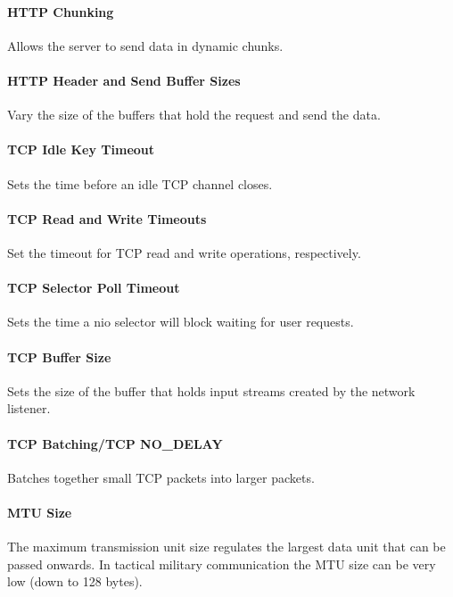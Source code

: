 \paragraph{HTTP Chunking} Allows the server to send data in dynamic chunks.

\paragraph{HTTP Header and Send Buffer Sizes} Vary the size of the buffers
that hold the request and send the data.

\paragraph{TCP Idle Key Timeout} Sets the time before an idle TCP channel
closes.

\paragraph{TCP Read and Write Timeouts} Set the timeout for TCP read and write
operations, respectively.

\paragraph{TCP Selector Poll Timeout} Sets the time a \gls{nio} selector will
block waiting for user requests.

\paragraph{TCP Buffer Size} Sets the size of the buffer that holds input streams
created by the network listener.

\paragraph{TCP Batching/TCP NO\_DELAY} Batches together small TCP packets into
larger packets.

\paragraph{MTU Size} The maximum transmission unit size regulates the largest
data unit that can be passed onwards. In tactical military communication the MTU
size can be very low (down to 128 bytes).

\paragraph{}

